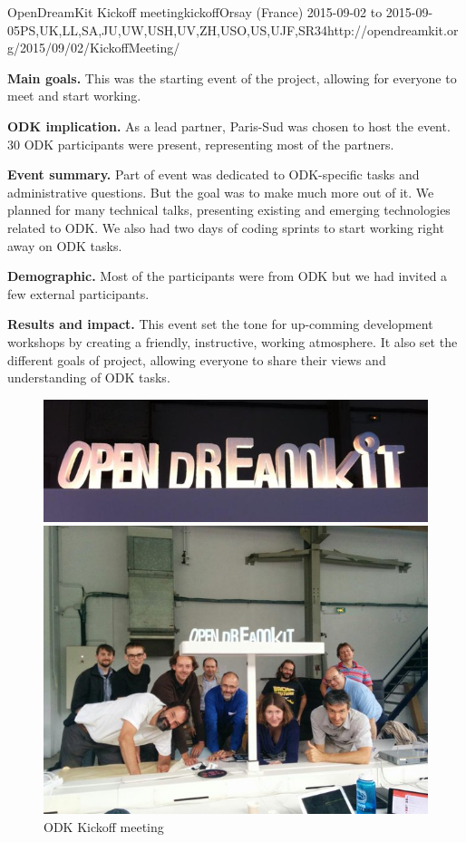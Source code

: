 \begin{event}{OpenDreamKit Kickoff meeting}{kickoff}{Orsay (France) 2015-09-02 to 2015-09-05}{PS,UK,LL,SA,JU,UW,USH,UV,ZH,USO,US,UJF,SR}{34}{http://opendreamkit.org/2015/09/02/KickoffMeeting/}

\textbf{Main goals.} This was the starting event of the project, allowing for everyone to meet and start working.

\textbf{ODK implication.} As a lead partner, Paris-Sud was chosen to host the event. 30 ODK participants were present, 
representing most of the partners.

\textbf{Event summary.} Part of event was dedicated to ODK-specific tasks and administrative questions. But the goal
was to make much more out of it. We planned for many technical talks, presenting existing and emerging technologies
related to ODK. We also had two days of coding sprints to start working right away on ODK tasks.

\textbf{Demographic.} Most of the participants were from ODK but we had invited a few external participants.

\textbf{Results and impact.} This event set the tone for up-comming development workshops by creating a friendly, instructive, 
working atmosphere. It also set the different goals of project, allowing everyone to share their views and
understanding of ODK tasks.

\begin{figure}[ht]
\caption*{ODK Kickoff meeting}
\includegraphics[scale=0.3]{pictures/kickoff1.jpg}

\includegraphics[scale=0.5]{pictures/kickoff2.jpg}
\end{figure}



\end{event}
